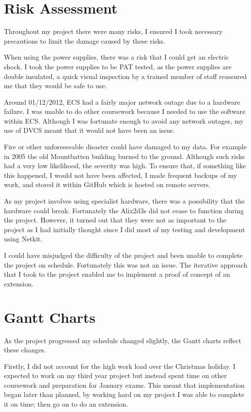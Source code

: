 \documentclass[12pt,a4paper,twoside]{report}
\begin{document}
\section{Risk Assessment}
Throughout my project there were many risks, I ensured I took necessary
precautions to limit the damage caused by these risks.

When using the power supplies, there was a risk that I could get an electric
shock. I took the power supplies to be PAT tested, as the power supplies are
double insulated, a quick visual inspection by a trained member of staff
reassured me that they would be safe to use.

Around 01/12/2012, ECS had a fairly major network outage due to a hardware
failure. I was unable to do other coursework because I needed to use the
software within ECS\@. Although I was fortunate enough to avoid any network
outages, my use of DVCS meant that it would not have been an issue.

Fire or other unforeseeable disaster could have damaged to my data. For example
in 2005 the old Mountbatten building burned to the ground. Although such risks
had a very low likelihood, the severity was high.  To ensure that, if something
like this happened, I would not have been affected, I made frequent backups of
my work, and stored it within GitHub which is hosted on remote servers.

As my project involves using specialist hardware, there was a possibility that
the hardware could break. Fortunately the Alix2d3s did not cease to function
during the project. However, it turned out that they were not as important to
the project as I had initially thought since I did most of my testing and
development using Netkit.

I could have misjudged the difficulty of the project and been unable to complete
the project on schedule. Fortunately this was not an issue. The iterative
approach that I took to the project enabled me to implement a proof of
concept of an extension.  

\section{Gantt Charts}
As the project progressed my schedule changed slightly, the Gantt charts
reflect these changes.

Firstly, I did not account for the high work load over the Christmas holiday. I
expected to work on my third year project but instead spent time on other
coursework and preparation for January exams. This meant that implementation
began later than planned, by working hard on my project I was able to complete
it on time; then go on to do an extension. 
\end{document}
